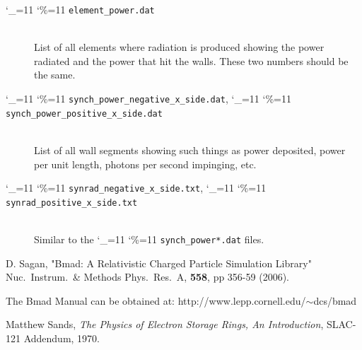 \documentclass[11pt]{article}
\newcommand\ttcmd{\begingroup\catcode`\_=11 \catcode`\%=11 \dottcmd}
\newcommand\dottcmd[1]{\texttt{#1}\endgroup}
\newcommand{\vn}{\ttcmd}
\newcommand{\Newline}{\hfil \\}
\begin{document}
  \begin{description}
  \item[\vn{element_power.dat}] \Newline
List of all elements where radiation is produced showing the power radiated and
the power that hit the walls. These two numbers should be the same.
  \item[\vn{synch_power_negative_x_side.dat}, \vn{synch_power_positive_x_side.dat}] \Newline
List of all wall segments showing such things as power deposited, power per unit length, photons
per second impinging, etc.
  \item[\vn{synrad_negative_x_side.txt}, \vn{synrad_positive_x_side.txt}] \Newline
Similar to the \vn{synch_power*.dat} files.
  \end{description}

\begin{thebibliography}{9}

D. Sagan,
"Bmad: A Relativistic Charged Particle Simulation Library"
Nuc.\ Instrum.\ \& Methods Phys.\ Res.\ A, {\bf 558}, pp 356-59 (2006).

The Bmad Manual can be obtained at:\hfill\break
\hspace*{20pt} http://www.lepp.cornell.edu/$\scriptstyle\sim$dcs/bmad

Matthew Sands, {\em The Physics of Electron Storage Rings, An Introduction},
SLAC-121 Addendum, 1970.

\end{thebibliography}
\end{document}

